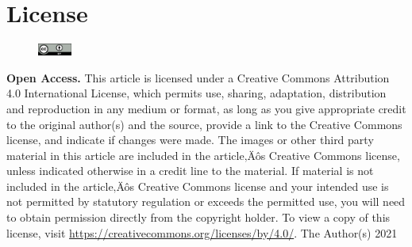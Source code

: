 \documentclass[twocolumn, serif, reflection, authordate]{jote-article}
\begin{document}
 \section*{License}
        \begin{figure}%
        \vspace{-12pt}
        \includegraphics[width=0.1\textwidth]{media/by}%
        \end{figure}
        \textbf{\textsf{Open Access.}} This article is licensed under a Creative Commons Attribution 4.0 International License, which permits use, sharing, adaptation, distribution and reproduction in any medium or format, as long as you give appropriate credit to the original author(s) and the source, provide a link to the Creative Commons license, and indicate if changes were made. The images or other third party material in this article are included in the article‚Äôs Creative Commons license, unless indicated otherwise in a credit line to the material. If material is not included in the article‚Äôs Creative Commons license and your intended use is not permitted by statutory regulation or exceeds the permitted use, you will need to obtain permission directly from the copyright holder. To view a copy of this license, visit \href{https://creativecommons.org/licenses/by/4.0/}{https://creativecommons.org/licenses/by/4.0/}.
        \newline\newline
        \textcopyright \text{ }The Author(s) 2021%
\end{document}

